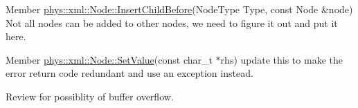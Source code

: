 \label{dd/da0/todo__todo000051}
\hypertarget{dd/da0/todo__todo000051}{}
 
\begin{DoxyDescription}
\item[Member \hyperlink{classphys_1_1xml_1_1Node_a11be362cee3fc88c276076c8642189ab}{phys::xml::Node::InsertChildBefore}(NodeType Type, const Node \&node) ]Not all nodes can be added to other nodes, we need to figure it out and put it here. 
\end{DoxyDescription}

\label{dd/da0/todo__todo000043}
\hypertarget{dd/da0/todo__todo000043}{}
 
\begin{DoxyDescription}
\item[Member \hyperlink{classphys_1_1xml_1_1Node_a50ff9948dac721339561ed3442fb7034}{phys::xml::Node::SetValue}(const char\_\-t $\ast$rhs) ]update this to make the error return code redundant and use an exception instead. 

Review for possiblity of buffer overflow. 
\end{DoxyDescription}